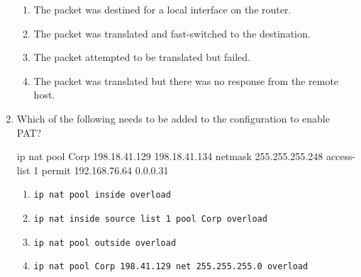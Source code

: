 \begin{enumerate}
  \begin{enumerate}
    \item
    The packet was destined for a local interface on the router.
  \item
    The packet was translated and fast-switched to the destination.
  \item
    The packet attempted to be translated but failed.
  \item
    The packet was translated but there was no response from the remote
    host.
  \end{enumerate}
\item
  Which of the following needs to be added to the configuration to
  enable PAT?

\begin{cli}
ip nat pool Corp 198.18.41.129 198.18.41.134 netmask 255.255.255.248
access-list 1 permit 192.168.76.64 0.0.0.31
\end{cli}

  \begin{enumerate}
    \item
    \texttt{ip\ nat\ pool\ inside\ overload}
  \item
    \texttt{ip\ nat\ inside\ source\ list\ 1\ pool\ Corp\ overload}
  \item
    \texttt{ip\ nat\ pool\ outside\ overload}
  \item
    \texttt{ip\ nat\ pool\ Corp\ 198.41.129\ net\ 255.255.255.0\ overload}
  \end{enumerate}
\end{enumerate}

